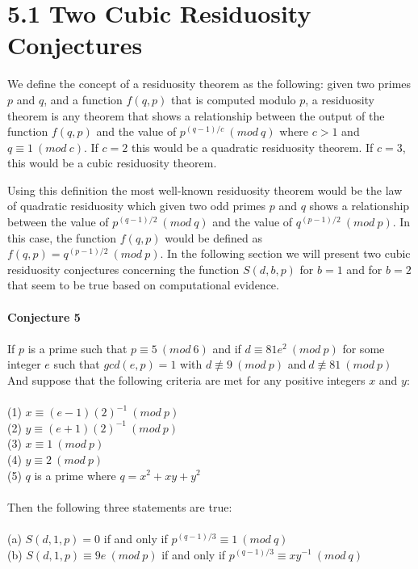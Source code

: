 \documentclass[final,letterpaper,oneside,10pt]{article}
\begin{document}
\section*{5.1 Two Cubic Residuosity Conjectures }

We define the concept of a residuosity theorem as the following: given two primes $p$ and $q$, and a function $f(q,p)$ that is computed modulo $p$,
a residuosity theorem is any theorem that shows a relationship between the output of the function $f(q,p)$ and the value of $p^{(q-1)/c}~(mod~q)$
where $c>1$ and $q \equiv 1~(mod~c)$.  If $c=2$ this would be a quadratic residuosity theorem.  If $c=3$, this would be a cubic residuosity theorem.

Using this definition the most well-known residuosity theorem would be the law of quadratic residuosity which given two odd primes $p$ and $q$ shows a
relationship between the value of $p^{(q-1)/2}~(mod~q)$ and the value of $q^{(p-1)/2}~(mod~p)$.  In this case, the function $f(q,p)$ would be 
defined as $f(q,p) = q^{(p-1)/2}~(mod~p)$.  In the following section we will present two cubic residuosity conjectures concerning the function $S(d,b,p)$
for $b=1$ and for $b=2$ that seem to be true based on computational evidence.
\\
\\
\textbf{Conjecture 5}
\\
\\
If $p$ is a prime such that $p \equiv 5~(mod~6)$ and if $d \equiv 81e^2~(mod~p)$ for some integer $e$ such that $gcd(e,p)=1$ with 
$d \not\equiv 9~(mod~p) $ and$~d \not\equiv 81~(mod~p) $
\\
And suppose that the following criteria are met for any positive integers $x$ and $y$:
\\
\\
(1) $x \equiv (e-1)(2)^{-1}~(mod~p)$
\\
(2) $y \equiv (e+1)(2)^{-1}~(mod~p)$
\\
(3) $x \equiv 1~(mod~p)$
\\
(4) $y \equiv 2~(mod~p)$
\\
(5) $q$ is a prime where $q = x^2 +xy + y^2$
\\
\\
Then the following three statements are true:
\\
\\
(a) $S(d,1,p) = 0$ if and only if $p^{(q-1)/3} \equiv 1~(mod~q)$
\\
(b) $S(d,1,p) \equiv 9e~(mod~p)$  if and only if $p^{(q-1)/3} \equiv xy^{-1}~(mod~q)$
\end{document}
